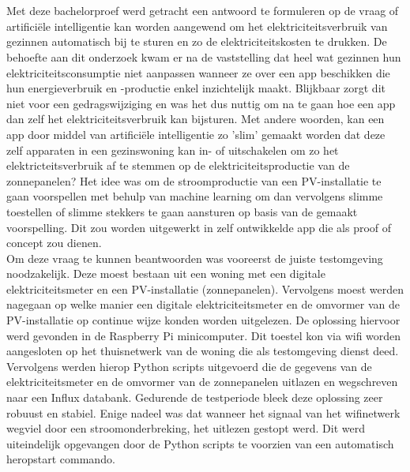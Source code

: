 
\chapter{}%
\label{ch:conclusie}

Met deze bachelorproef werd getracht een antwoord te formuleren op de vraag of artificiële intelligentie kan worden aangewend om het elektriciteitsverbruik van gezinnen automatisch bij te sturen en zo de elektriciteitskosten te drukken. De behoefte aan dit onderzoek kwam er na de vaststelling dat heel wat gezinnen hun elektriciteitsconsumptie niet aanpassen wanneer ze over een app beschikken die hun energieverbruik en -productie enkel inzichtelijk maakt. Blijkbaar zorgt dit niet voor een gedragswijziging en was het dus nuttig om na te gaan hoe een app dan zelf het elektriciteitsverbruik kan bijsturen. Met andere woorden, kan een app door middel van artificiële intelligentie zo 'slim' gemaakt worden dat deze zelf apparaten in een gezinswoning kan in- of uitschakelen om zo het elektricteitsverbruik af te stemmen op de elektriciteitsproductie van de zonnepanelen? Het idee was om de stroomproductie van een PV-installatie te gaan voorspellen met behulp van machine learning om dan vervolgens slimme toestellen of slimme stekkers te gaan aansturen op basis van de gemaakt voorspelling. Dit zou worden uitgewerkt in zelf ontwikkelde app die als proof of concept zou dienen.\\

Om deze vraag te kunnen beantwoorden was vooreerst de juiste testomgeving noodzakelijk. Deze moest bestaan uit een woning met een digitale elektriciteitsmeter en een PV-installatie (zonnepanelen). Vervolgens moest werden nagegaan op welke manier een digitale elektriciteitsmeter en de omvormer van de PV-installatie op continue wijze konden worden uitgelezen. De oplossing hiervoor werd gevonden in de Raspberry Pi minicomputer. Dit toestel kon via wifi worden aangesloten op het thuisnetwerk van de woning die als testomgeving dienst deed. Vervolgens werden hierop Python scripts uitgevoerd die de gegevens van de elektriciteitsmeter en de omvormer van de zonnepanelen uitlazen en wegschreven naar een Influx databank. Gedurende de testperiode bleek deze oplossing zeer robuust en stabiel. Enige nadeel was dat wanneer het signaal van het wifinetwerk wegviel door een stroomonderbreking, het uitlezen gestopt werd. Dit werd uiteindelijk opgevangen door de Python scripts te voorzien van een automatisch heropstart commando. \\

